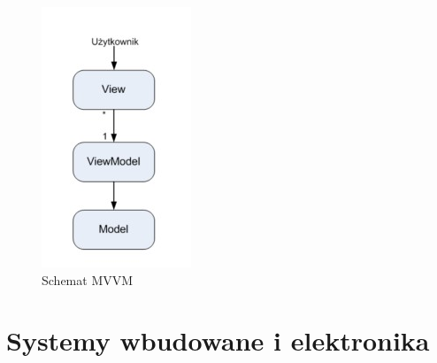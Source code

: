 \documentclass[a4paper,12pt,oneside]{book}
\begin{document}
                \begin{figure}[h]
                    \centering
                    \includegraphics[width=\textwidth/4]{images/mvvm.jpg}
                    \caption{Schemat MVVM}
                    \label{fig:twojastara5}
                \end{figure}
                
		\newpage\section{Systemy wbudowane i elektronika}
\end{document}
